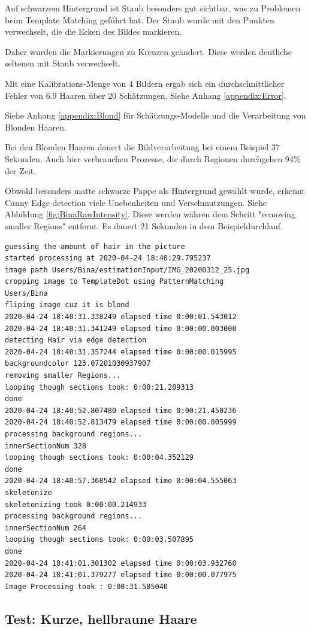 \documentclass[german,a4paper, 12pt]{llncs}
\begin{document}
Auf schwarzem Hintergrund ist Staub besonders gut sichtbar, was zu Problemen beim Template Matching geführt hat. Der Staub wurde mit den Punkten verwechselt, die die Ecken des Bildes markieren.

Daher wurden die Markierungen zu Kreuzen geändert. Diese werden deutliche seltenen mit Staub verwechselt. 

Mit eine Kalibrations-Menge von 4 Bildern ergab sich ein durchschnittlicher Fehler von 6.9 Haaren über 20 Schätzungen. 
Siehe Anhang \ref{appendix:Error}.

Siehe Anhang \ref{appendix:Blond} für Schätzungs-Modelle und die Verarbeitung von Blonden Haaren.

Bei den Blonden Haaren dauert die Bildverarbeitung bei einem Beispiel 37 Sekunden. 
Auch hier verbrauchen Prozesse, die durch Regionen durchgehen 94\% der Zeit.

Obwohl besonders matte schwarze Pappe als Hintergrund gewählt wurde, erkennt Canny Edge detection viele Unebenheiten und Verschmutzungen. Siehe Abbildung \ref{fig:BinaRawIntensity}. Diese werden währen dem Schritt "removing smaller Regions" entfernt. Es dauert 21 Sekunden in dem Beispieldurchlauf. 

\begin{lstlisting}[style=DOS]
guessing the amount of hair in the picture
started processing at 2020-04-24 18:40:29.795237
image path Users/Bina/estimationInput/IMG_20200312_25.jpg
cropping image to TemplateDot using PatternMatching
Users/Bina
fliping image cuz it is blond
2020-04-24 18:40:31.338249 elapsed time 0:00:01.543012
2020-04-24 18:40:31.341249 elapsed time 0:00:00.003000
detecting Hair via edge detection
2020-04-24 18:40:31.357244 elapsed time 0:00:00.015995
backgroundcolor 123.07201030937907
removing smaller Regions...
looping though sections took: 0:00:21.209313
done
2020-04-24 18:40:52.807480 elapsed time 0:00:21.450236
2020-04-24 18:40:52.813479 elapsed time 0:00:00.005999
processing background regions...
innerSectionNum 328
looping though sections took: 0:00:04.352129
done
2020-04-24 18:40:57.368542 elapsed time 0:00:04.555063
skeletonize
skeletonizing took 0:00:00.214933
processing background regions...
innerSectionNum 264
looping though sections took: 0:00:03.507895
done
2020-04-24 18:41:01.301302 elapsed time 0:00:03.932760
2020-04-24 18:41:01.379277 elapsed time 0:00:00.077975
Image Processing took : 0:00:31.585040
\end{lstlisting}

\subsection{Test: Kurze, hellbraune Haare}
\end{document}
